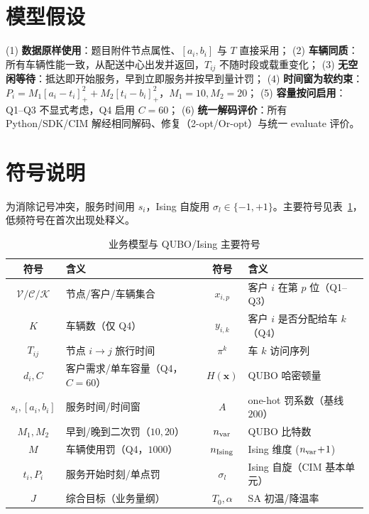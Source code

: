\documentclass[UTF8,12pt,a4paper]{ctexart}
\begin{document}
\section{模型假设}

(1) \textbf{数据原样使用}：题目附件节点属性、$[a_i,b_i]$ 与 $T$ 直接采用；
(2) \textbf{车辆同质}：所有车辆性能一致，从配送中心出发并返回，$T_{ij}$ 不随时段或载重变化；
(3) \textbf{无空闲等待}：抵达即开始服务，早到立即服务并按早到量计罚；
(4) \textbf{时间窗为软约束}：$P_i=M_1[a_i\!-\!t_i]_+^2+M_2[t_i\!-\!b_i]_+^2$，$M_1=10,M_2=20$；
(5) \textbf{容量按问启用}：Q1--Q3 不显式考虑，Q4 启用 $C=60$；
(6) \textbf{统一解码评价}：所有 Python/SDK/CIM 解经相同解码、修复（2-opt/Or-opt）与统一 evaluate 评价。

\section{符号说明}

为消除记号冲突，服务时间用 $s_i$，Ising 自旋用 $\sigma_l\!\in\!\{-1,+1\}$。主要符号见表~\ref{tab:sym}，低频符号在首次出现处释义。

\begin{table}[H]
    \centering\footnotesize
    \caption{业务模型与 QUBO/Ising 主要符号}
    \label{tab:sym}
    \begin{tabular}{c l c l}
        \toprule
        符号 & 含义 & 符号 & 含义 \\
        \midrule
        $\mathcal V/\mathcal C/\mathcal K$ & 节点/客户/车辆集合 & $x_{i,p}$ & 客户 $i$ 在第 $p$ 位（Q1--Q3） \\
        $K$ & 车辆数（仅 Q4） & $y_{i,k}$ & 客户 $i$ 是否分配给车 $k$（Q4） \\
        $T_{ij}$ & 节点 $i\!\to\!j$ 旅行时间 & $\pi^{k}$ & 车 $k$ 访问序列 \\
        $d_i,C$ & 客户需求/单车容量（Q4，$C\!=\!60$） & $H(\mathbf{x})$ & QUBO 哈密顿量 \\
        $s_i,[a_i,b_i]$ & 服务时间/时间窗 & $A$ & one-hot 罚系数（基线 $200$） \\
        $M_1,M_2$ & 早到/晚到二次罚（$10,20$） & $n_{\rm var}$ & QUBO 比特数 \\
        $M$ & 车辆使用罚（Q4，$1000$） & $n_{\rm Ising}$ & Ising 维度 ($n_{\rm var}\!+\!1$) \\
        $t_i,P_i$ & 服务开始时刻/单点罚 & $\sigma_l$ & Ising 自旋（CIM 基本单元） \\
        $J$ & 综合目标（业务量纲） & $T_0,\alpha$ & SA 初温/降温率 \\
        \bottomrule
    \end{tabular}
\end{table}
\end{document}
